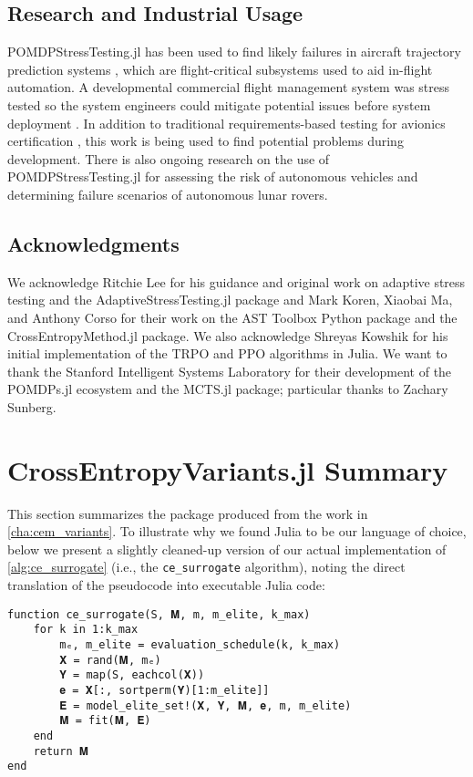 \subsection{Research and Industrial Usage}

POMDPStressTesting.jl has been used to find likely failures in aircraft trajectory prediction systems \cite{ast_fms}, which are flight-critical subsystems used to aid in-flight automation.
A developmental commercial flight management system was stress tested so the system engineers could mitigate potential issues before system deployment \cite{ast_fms}.
In addition to traditional requirements-based testing for avionics certification \cite{do178c}, this work is being used to find potential problems during development.
There is also ongoing research on the use of POMDPStressTesting.jl for assessing the risk of autonomous vehicles and determining failure scenarios of autonomous lunar rovers. 


\subsection{Acknowledgments}

We acknowledge Ritchie Lee for his guidance and original work on adaptive stress testing and the AdaptiveStressTesting.jl package and Mark Koren, Xiaobai Ma, and Anthony Corso for their work on the AST Toolbox Python package and the CrossEntropyMethod.jl package.
We also acknowledge Shreyas Kowshik for his initial implementation of the TRPO and PPO algorithms in Julia.
We want to thank the Stanford Intelligent Systems Laboratory for their development of the POMDPs.jl ecosystem and the MCTS.jl package; particular thanks to Zachary Sunberg.


\section{CrossEntropyVariants.jl Summary}

This section summarizes the package produced from the work in \cref{cha:cem_variants}. To illustrate why we found Julia to be our language of choice, below we present a slightly cleaned-up version of our actual implementation of \cref{alg:ce_surrogate} (i.e., the \texttt{ce\_surrogate} algorithm), noting the direct translation of the pseudocode into executable Julia code:

\begin{lstlisting}[language=JuliaLocal]
function ce_surrogate(S, 𝐌, m, m_elite, k_max)
    for k in 1:k_max
        mₑ, m_elite = evaluation_schedule(k, k_max)
        𝐗 = rand(𝐌, mₑ)
        𝐘 = map(S, eachcol(𝐗))
        𝐞 = 𝐗[:, sortperm(𝐘)[1:m_elite]]
        𝐄 = model_elite_set!(𝐗, 𝐘, 𝐌, 𝐞, m, m_elite)
        𝐌 = fit(𝐌, 𝐄)
    end
    return 𝐌
end
\end{lstlisting}

